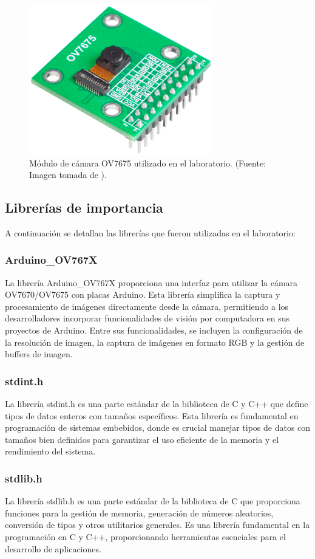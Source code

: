 \begin{figure}[H]
\centering
\includegraphics[width=80mm]{./Figuras/Nota_teorica/OV7675}
\caption{Módulo de cámara OV7675 utilizado en el laboratorio. (Fuente: Imagen tomada de \cite{OV}).} 
\label{fig:OV7675}
\end{figure}

\subsection{Librerías de importancia}

A continuación se detallan las librerías que fueron utilizadas en el laboratorio:
\subsubsection{Arduino\_OV767X}
La librería Arduino\_OV767X proporciona una interfaz para utilizar la cámara OV7670/OV7675 con placas Arduino. Esta librería simplifica la captura y procesamiento de imágenes directamente desde la cámara, permitiendo a los desarrolladores incorporar funcionalidades de visión por computadora en sus proyectos de Arduino. Entre sus funcionalidades, se incluyen la configuración de la resolución de imagen, la captura de imágenes en formato RGB y la gestión de buffers de imagen.
\subsubsection{stdint.h}
La librería stdint.h es una parte estándar de la biblioteca de C y C++ que define tipos de datos enteros con tamaños específicos. Esta librería es fundamental en programación de sistemas embebidos, donde es crucial manejar tipos de datos con tamaños bien definidos para garantizar el uso eficiente de la memoria y el rendimiento del sistema.
\subsubsection{stdlib.h}
 La librería stdlib.h es una parte estándar de la biblioteca de C que proporciona funciones para la gestión de memoria, generación de números aleatorios, conversión de tipos y otros utilitarios generales. Es una librería fundamental en la programación en C y C++, proporcionando herramientas esenciales para el desarrollo de aplicaciones.
 
